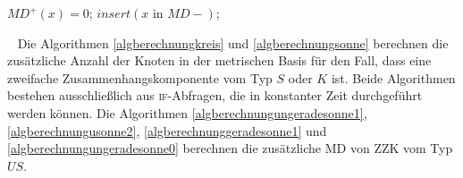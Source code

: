 \begin{algorithm}
\caption{$S(x)$}
\begin{algorithmic}[1]
\vspace{2mm}
{
\ENDIF} 
 \STATE $MD^+(x)=0$; $insert(x \text{ in } MD-)$;
\ENDIF
\vspace{2mm}
\end{algorithmic}
\label{algberechnungsonne}
\end{algorithm}
\vspace{-10mm}
~\linebreak 
Die Algorithmen \ref{algberechnungkreis} und \ref{algberechnungsonne} berechnen die zusätzliche Anzahl der Knoten in der metrischen Basis für den Fall, dass eine zweifache Zusammenhangskomponente vom Typ $S$ oder $K$ ist. Beide Algorithmen bestehen ausschließlich aus \textsc{if}-Abfragen, die in konstanter Zeit durchgeführt werden können.
\clearpage
Die Algorithmen \ref{algberechnungungeradesonne1}, \ref{algberechnungusonne2}, \ref{algberechnunggeradesonne1} und \ref{algberechnungungeradesonne0} berechnen die zusätzliche MD von ZZK vom Typ $US$.\\ 
\vspace{-6mm}
